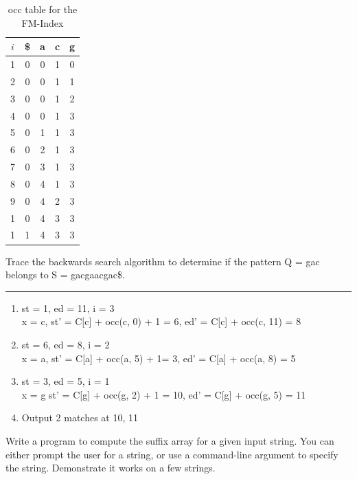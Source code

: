 \documentclass[11pt]{article}
\begin{document}
\begin{table}[h]
    \centering
    \begin{tabular}{| c | c | c | c | c |}
        \hline
        $i$  & \$ & a & c & g \\ \hline
            1 & 0 & 0 & 1 & 0 \\
            2 & 0 & 0 & 1 & 1 \\
            3 & 0 & 0 & 1 & 2 \\
            4 & 0 & 0 & 1 & 3 \\
            5 & 0 & 1 & 1 & 3 \\
            6 & 0 & 2 & 1 & 3 \\
            7 & 0 & 3 & 1 & 3 \\
            8 & 0 & 4 & 1 & 3 \\
            9 & 0 & 4 & 2 & 3 \\
            1 & 0 & 4 & 3 & 3 \\
            1 & 1 & 4 & 3 & 3 \\ \hline
    \end{tabular}
    \caption{occ table for the FM-Index}
\end{table}

Trace the backwards search algorithm to determine if the pattern Q = gac belongs to S = gacgaacgac\$.

\hrule

\begin{enumerate}
    \item 
    st = 1,
    ed = 11,
    i = 3 \\
    x = c,
    st' = C[c] + occ(c, 0) + 1 = 6,
    ed' = C[c] + occ(c, 11) = 8

    \item
    st = 6,
    ed = 8,
    i = 2 \\
    x = a,
    st' = C[a] + occ(a, 5) + 1= 3,
    ed' = C[a] + occ(a, 8) = 5

    \item
    st = 3,
    ed = 5,
    i = 1 \\
    x = g
    st' = C[g] + occ(g, 2) + 1 = 10,
    ed' = C[g] + occ(g, 5) = 11

    \item Output 2 matches at 10, 11
\end{enumerate}

Write a program to compute the suffix array for a given input string.
You can either prompt the user for a string, or use a command-line argument to specify the string.
Demonstrate it works on a few strings.
\end{document}
